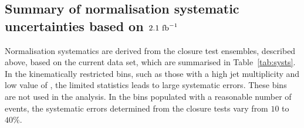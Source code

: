 \subsection{Summary of normalisation systematic uncertainties based on $2.1~\ifb$}
\label{sec:closure-test-syst}


Normalisation systematics are derived from the closure test ensembles,
described above, based on the current data set, which are summarised
in Table~\ref{tab:systs}. In the kinematically restricted bins, such
as those with a high jet multiplicity and low value of \scalht, the
limited statistics leads to large systematic errors. These bins are
not used in the analysis. 
In the bins populated with a reasonable number of events, the
systematic errors determined from the closure tests vary from $10$ to
$40\%$.

